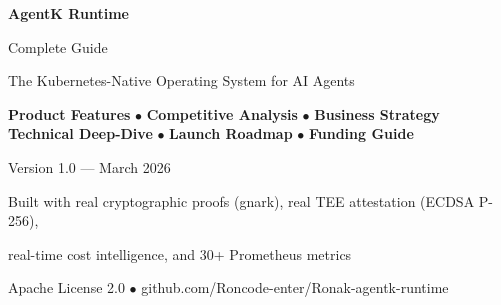 \documentclass[12pt,a4paper,openany]{report}
\begin{document}
\begin{titlepage}
\centering
\vspace*{2cm}

{\Huge\bfseries\textcolor{agentk-blue}{AgentK Runtime}\par}
\vspace{0.5cm}
{\LARGE\textcolor{agentk-purple}{Complete Guide}\par}
\vspace{1cm}
{\Large\textcolor{agentk-gray}{The Kubernetes-Native Operating System for AI Agents}\par}

\vspace{2cm}


\vspace{2cm}

{\large
\textbf{Product Features} $\bullet$ \textbf{Competitive Analysis} $\bullet$ \textbf{Business Strategy}\\[0.3cm]
\textbf{Technical Deep-Dive} $\bullet$ \textbf{Launch Roadmap} $\bullet$ \textbf{Funding Guide}
}

\vspace{2cm}

{\large\textcolor{agentk-gray}{Version 1.0 — March 2026}\par}
\vspace{0.5cm}
{\normalsize\textcolor{agentk-gray}{Built with real cryptographic proofs (gnark), real TEE attestation (ECDSA P-256),}\par}
{\normalsize\textcolor{agentk-gray}{real-time cost intelligence, and 30+ Prometheus metrics}\par}

\vfill
{\small\textcolor{agentk-gray}{Apache License 2.0 $\bullet$ github.com/Roncode-enter/Ronak-agentk-runtime}\par}
\end{titlepage}
\end{document}
